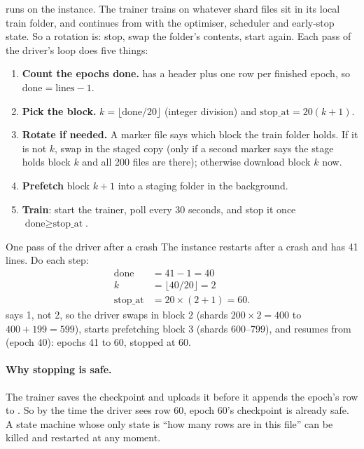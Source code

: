  runs on the instance. The trainer
trains on whatever shard files sit in its local train folder, and  continues from  with the
optimiser, scheduler and early-stop state. So a rotation is: stop, swap the folder's contents, start again. Each pass of the
driver's loop does five things:
\begin{enumerate}
  \item \textbf{Count the epochs done.}  has a header plus one row per finished epoch, so
    $\text{done} = \text{lines} - 1$.
  \item \textbf{Pick the block.} $k = \lfloor \text{done} / 20 \rfloor$ (integer division) and
    $\text{stop\_at} = 20(k+1)$.
  \item \textbf{Rotate if needed.} A marker file  says which block the train folder holds. If it is not $k$, swap
    in the staged copy (only if a second marker says the stage holds block $k$ and all 200 files are there); otherwise
    download block $k$ now.
  \item \textbf{Prefetch} block $k + 1$ into a staging folder in the background.
  \item \textbf{Train}: start the trainer, poll every 30 seconds, and stop it once $\text{done} \ge \text{stop\_at}$.
\end{enumerate}

\begin{worked}[label={we:pretrain:driver}]{One pass of the driver after a crash}
The instance restarts after a crash and  has 41 lines. Do each step:
\begin{align*}
  \text{done} &= 41 - 1 = 40\\
  k &= \lfloor 40 / 20 \rfloor = 2\\
  \text{stop\_at} &= 20 \times (2 + 1) = 60.
\end{align*}
 says 1, not 2, so the driver swaps in block 2 (shards $200 \times 2 = 400$ to $400 + 199 = 599$), starts
prefetching block 3 (shards 600--799), and resumes from  (epoch 40): epochs 41 to 60, stopped at 60.
\end{worked}

\paragraph{Why stopping is safe.} The trainer saves the checkpoint and uploads it before it appends the epoch's row to
. So by the time the driver sees row 60, epoch 60's checkpoint is already safe. A state machine whose only
state is ``how many rows are in this file'' can be killed and restarted at any moment.

